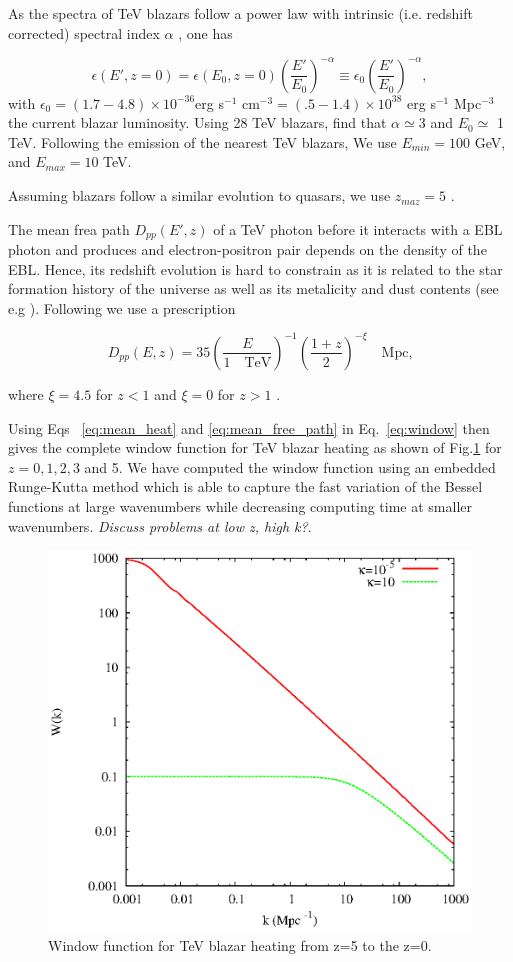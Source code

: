 \documentclass[twocolumns]{emulateapj}
\begin{document}
As the spectra of TeV blazars follow a power law with intrinsic (i.e. redshift corrected) spectral index $\alpha$ , one has

\begin{equation}
  \label{eq:blaz_lum}
  \epsilon(E',z=0)=\epsilon(E_0,z=0)\left(\frac{E'}{E_0}\right)^{-\alpha}\equiv \epsilon_0\left(\frac{E'}{E_0}\right)^{-\alpha},
\end{equation}
with $\epsilon_0=(1.7-4.8)\times 10^{-36}$erg s$^{-1}$ cm$^{-3}=(.5-1.4)\times 10^{38}$ erg s$^{-1}$ Mpc$^{-3}$ the current blazar luminosity. Using 28 TeV blazars, \citet{2012ApJ...752...23C} find that $\alpha\simeq 3$ and $E_0\simeq $ 1 TeV. Following the emission of the nearest TeV blazars, We use $E_{min}=100$ GeV,  and $E_{max}=10$ TeV.

Assuming blazars follow a similar evolution to quasars, we use $z_{maz}=5$  \citep{2007ApJ...654..731H}.

The mean frea path $D_{pp}(E',z)$ of a TeV photon before it interacts with a EBL photon and produces and electron-positron pair  depends on the density of the EBL.  Hence, its redshift evolution is hard to constrain as it is related to the star formation history of the universe as well as its metalicity and dust contents (see e.g \citet{2008A&A...487..837F,2006ApJ...648..774S}).  Following \citet{2012ApJ...752...23C} we use  a prescription 

  \begin{equation}
    \label{eq:mean_free_path}
  D_{pp}(E,z)=35\left(\frac{E}{1 \quad\textrm{TeV}}\right)^{-1} \left(\frac{1+z}{2}\right)^{-\xi} \quad \textrm{Mpc,}   
  \end{equation}

where $\xi=4.5$ for $z<1$ and $\xi=0$ for $z>1$ \citep{2004A&A...413..807K,2009PhRvD..80l3012N}. 

Using Eqs ~\ref{eq:mean_heat} and \ref{eq:mean_free_path} in Eq.~\ref{eq:window} then gives the complete window function for TeV blazar heating as shown of Fig.\ref{fig:window} for $z=0,1,2,3$ and 5. We have computed the window function using an embedded Runge-Kutta method which is able to capture the fast variation of the Bessel functions at large wavenumbers while decreasing computing time at smaller wavenumbers. \textit{Discuss problems at low z, high k?}.

\begin{figure}[h]
  \centering
  \includegraphics[width = .45\textwidth ]{newtonian_window}
  \caption{Window function for TeV blazar heating from z=5 to the z=0.}
  \label{fig:window}
\end{figure}
\end{document}
